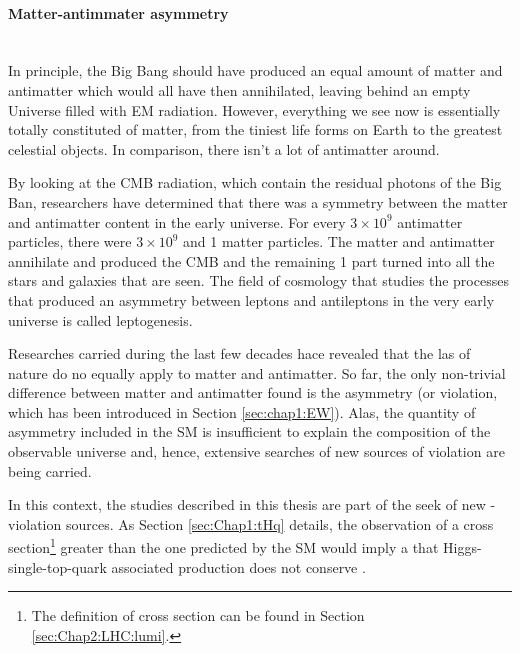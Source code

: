 


\paragraph{Matter-antimmater asymmetry}\mbox{}\\
In principle, the Big Bang should have produced an equal amount of matter and antimatter 
which would all have then annihilated, leaving behind an empty Universe filled with EM radiation.
 However, everything we see now is essentially totally constituted of matter, from the tiniest life forms 
 on Earth to the greatest celestial objects. In comparison, there isn't a lot of antimatter around. 

By looking at the CMB radiation, which contain the residual photons of the Big Ban, researchers 
have determined that there was a symmetry between the matter and antimatter content in the early universe. 
For every $3 \times 10^{9}$ antimatter particles, there were $3 \times 10^{9}$ and 1 matter particles.
The matter and antimatter annihilate and produced the CMB and the remaining 1 part turned into all the 
stars and galaxies that are seen.  The field of cosmology that studies the processes that produced an 
asymmetry between leptons and antileptons in the very early universe is called leptogenesis.

Researches carried during the last few decades hace revealed that the las of nature do no equally apply to
matter and antimatter. So far, the only non-trivial difference between matter and antimatter found is the \CP asymmetry
(or \CP violation, which has been introduced in Section \ref{sec:chap1:EW}). 
Alas, the quantity of \CP asymmetry included in the SM is insufficient to explain the composition of the observable
universe and, hence, extensive searches of new sources of \CP violation are being carried.

In this context, the studies described in this thesis are part of the seek of new \CP-violation sources. As Section
\ref{sec:Chap1:tHq} details, the observation of a cross section\footnote{The definition of cross section can be found in Section \ref{sec:Chap2:LHC:lumi}.}
 greater than the one predicted by the SM would imply
a that Higgs-single-top-quark associated production does not conserve \CP.



